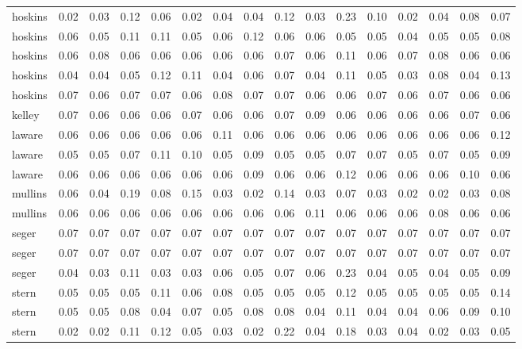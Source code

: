 \begin{tabular}{lrrrrrrrrrrrrrrr}
   hoskins & 0.02 & 0.03 & 0.12 & 0.06 & 0.02 & 0.04 & 0.04 & 0.12 & 0.03 &  0.23 &  0.10 &  0.02 &  0.04 &  0.08 &  0.07 \\
   hoskins & 0.06 & 0.05 & 0.11 & 0.11 & 0.05 & 0.06 & 0.12 & 0.06 & 0.06 &  0.05 &  0.05 &  0.04 &  0.05 &  0.05 &  0.08 \\
   hoskins & 0.06 & 0.08 & 0.06 & 0.06 & 0.06 & 0.06 & 0.06 & 0.07 & 0.06 &  0.11 &  0.06 &  0.07 &  0.08 &  0.06 &  0.06 \\
   hoskins & 0.04 & 0.04 & 0.05 & 0.12 & 0.11 & 0.04 & 0.06 & 0.07 & 0.04 &  0.11 &  0.05 &  0.03 &  0.08 &  0.04 &  0.13 \\
   hoskins & 0.07 & 0.06 & 0.07 & 0.07 & 0.06 & 0.08 & 0.07 & 0.07 & 0.06 &  0.06 &  0.07 &  0.06 &  0.07 &  0.06 &  0.06 \\
    kelley & 0.07 & 0.06 & 0.06 & 0.06 & 0.07 & 0.06 & 0.06 & 0.07 & 0.09 &  0.06 &  0.06 &  0.06 &  0.06 &  0.07 &  0.06 \\
    laware & 0.06 & 0.06 & 0.06 & 0.06 & 0.06 & 0.11 & 0.06 & 0.06 & 0.06 &  0.06 &  0.06 &  0.06 &  0.06 &  0.06 &  0.12 \\
    laware & 0.05 & 0.05 & 0.07 & 0.11 & 0.10 & 0.05 & 0.09 & 0.05 & 0.05 &  0.07 &  0.07 &  0.05 &  0.07 &  0.05 &  0.09 \\
    laware & 0.06 & 0.06 & 0.06 & 0.06 & 0.06 & 0.06 & 0.09 & 0.06 & 0.06 &  0.12 &  0.06 &  0.06 &  0.06 &  0.10 &  0.06 \\
   mullins & 0.06 & 0.04 & 0.19 & 0.08 & 0.15 & 0.03 & 0.02 & 0.14 & 0.03 &  0.07 &  0.03 &  0.02 &  0.02 &  0.03 &  0.08 \\
   mullins & 0.06 & 0.06 & 0.06 & 0.06 & 0.06 & 0.06 & 0.06 & 0.06 & 0.11 &  0.06 &  0.06 &  0.06 &  0.08 &  0.06 &  0.06 \\
     seger & 0.07 & 0.07 & 0.07 & 0.07 & 0.07 & 0.07 & 0.07 & 0.07 & 0.07 &  0.07 &  0.07 &  0.07 &  0.07 &  0.07 &  0.07 \\
     seger & 0.07 & 0.07 & 0.07 & 0.07 & 0.07 & 0.07 & 0.07 & 0.07 & 0.07 &  0.07 &  0.07 &  0.07 &  0.07 &  0.07 &  0.07 \\
     seger & 0.04 & 0.03 & 0.11 & 0.03 & 0.03 & 0.06 & 0.05 & 0.07 & 0.06 &  0.23 &  0.04 &  0.05 &  0.04 &  0.05 &  0.09 \\
     stern & 0.05 & 0.05 & 0.05 & 0.11 & 0.06 & 0.08 & 0.05 & 0.05 & 0.05 &  0.12 &  0.05 &  0.05 &  0.05 &  0.05 &  0.14 \\
     stern & 0.05 & 0.05 & 0.08 & 0.04 & 0.07 & 0.05 & 0.08 & 0.08 & 0.04 &  0.11 &  0.04 &  0.04 &  0.06 &  0.09 &  0.10 \\
     stern & 0.02 & 0.02 & 0.11 & 0.12 & 0.05 & 0.03 & 0.02 & 0.22 & 0.04 &  0.18 &  0.03 &  0.04 &  0.02 &  0.03 &  0.05 \\
\bottomrule
\end{tabular}
